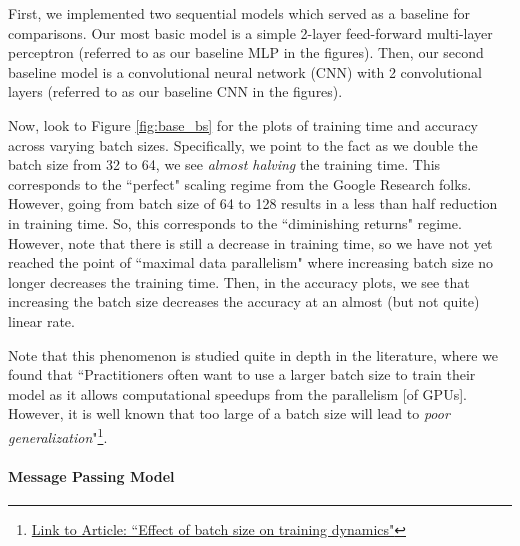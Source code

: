 \documentclass{article}
\begin{document}
First, we implemented two sequential models which served as a baseline for comparisons. Our most basic model is a simple 2-layer feed-forward multi-layer perceptron (referred to as our baseline MLP in the figures). Then, our second baseline model is a convolutional neural network (CNN) with 2 convolutional layers (referred to as our baseline CNN in the figures).

Now, look to Figure \ref{fig:base_bs} for the plots of training time and accuracy across varying batch sizes. Specifically, we point to the fact as we double the batch size from 32 to 64, we see \textit{almost halving} the training time. This corresponds to the ``perfect" scaling regime from the Google Research folks. However, going from batch size of 64 to 128 results in a less than half reduction in training time. So, this corresponds to the ``diminishing returns" regime. However, note that there is still a decrease in training time, so we have not yet reached the point of ``maximal data parallelism" where increasing batch size no longer decreases the training time. Then, in the accuracy plots, we see that increasing the batch size decreases the accuracy at an almost (but not quite) linear rate.

Note that this phenomenon is studied quite in depth in the literature, where we found that ``Practitioners often want to use a larger batch size to train their model as it allows computational speedups from the parallelism [of GPUs]. However, it is well known that too large of a batch size will lead to \textit{poor generalization}"\footnote{\href{https://medium.com/mini-distill/effect-of-batch-size-on-training-dynamics-21c14f7a716e}{Link to Article: ``Effect of batch size on training dynamics"}}.

\paragraph{Message Passing Model}
\end{document}
